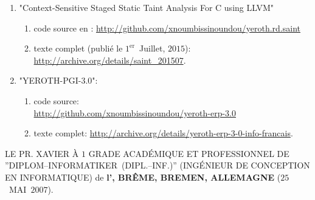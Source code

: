 \begin{enumerate}
	\item "Context-Sensitive Staged Static Taint Analysis
			For C using LLVM"
		\begin{enumerate}[1.]
			\itemsep -0.7em
			\item code source en \cplusplus: \url{http://github.com/xnoumbissinoundou/yeroth.rd.saint}
			\item texte complet (publié le $1^\text{er}$~Juillet, $2015$): \url{http://archive.org/details/saint_201507}.
		\end{enumerate}		 

	\item "YEROTH-PGI-3.0":
			\begin{enumerate}[1.]
			\itemsep -0.7em
			\item code source: \\
			\url{http://github.com/xnoumbissinoundou/yeroth-erp-3.0}
			\item texte complet:
				\url{http://archive.org/details/yeroth-erp-3-0-info-francais}.
		\end{enumerate}	
\end{enumerate}


LE PR. XAVIER À $1$ GRADE ACADÉMIQUE ET PROFESSIONNEL
DE ''DIPLOM--INFORMATIKER~(DIPL.--INF.)''
(INGÉNIEUR DE CONCEPTION EN INFORMATIQUE) de
\textbf{l'\bremenu, BRÊME, BREMEN, ALLEMAGNE}
($25$~MAI~$2007$).

